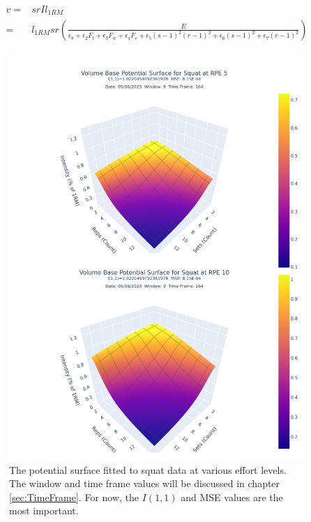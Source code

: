 \begin{equation}
    \label{eq:VolumeBaseIntensitySubedInVolume}
    \begin{split}
    		v = & srI l_{1RM} \\
    			= & l_{1RM} sr \left( 
    			\frac{
    				E
    			}{
    				\epsilon_8+
    				\epsilon_2 F_l+
    				\epsilon_3 F_w+
    				\epsilon_4 F_e+
    				\epsilon_5 (s-1)^2(r-1)^2+
    				\epsilon_6 (s-1)^2+
    				\epsilon_7 (r-1)^2
    			}
    		\right)
    \end{split}
\end{equation}

\begin{figure}[htbp]
    \centering
    \includegraphics[scale=0.55]{images/ch3/PotentialSurface/DualSquat.Effort[5,10].volumeBase.png}
    \caption{The potential surface fitted to squat data at various effort levels. The window and time frame values will be discussed in chapter \ref{sec:TimeFrame}. For now, the $I(1,1)$ and MSE values are the most important.}
    \label{fig:VolumeBaseSquatPotentialSurfaceAcrossEffort}
\end{figure}

